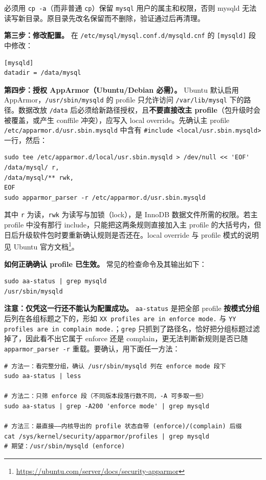 \documentclass[12pt,UTF8]{ctexbook}
\begin{document}
必须用 \texttt{cp -a}（而非普通 \texttt{cp}）保留 \texttt{mysql} 用户的属主和权限，否则 mysqld 无法读写新目录。原目录先改名保留而不删除，验证通过后再清理。

\textbf{第三步：修改配置。} 在 \texttt{/etc/mysql/mysql.conf.d/mysqld.cnf} 的 \texttt{[mysqld]} 段中修改：

\begin{lstlisting}
[mysqld]
datadir = /data/mysql
\end{lstlisting}

\textbf{第四步：授权 AppArmor（Ubuntu/Debian 必需）。} Ubuntu 默认启用 AppArmor，\texttt{/usr/sbin/mysqld} 的 profile 只允许访问 \texttt{/var/lib/mysql} 下的路径。数据改放 \texttt{/data} 后必须给新路径授权，且\textbf{不要直接改主 profile}（包升级时会被覆盖，或产生 conffile 冲突），应写入 local override。先确认主 profile \texttt{/etc/apparmor.d/usr.sbin.mysqld} 中含有 \verb|#include <local/usr.sbin.mysqld>| 一行，然后：

\begin{lstlisting}
sudo tee /etc/apparmor.d/local/usr.sbin.mysqld > /dev/null << 'EOF'
/data/mysql/ r,
/data/mysql/** rwk,
EOF
sudo apparmor_parser -r /etc/apparmor.d/usr.sbin.mysqld
\end{lstlisting}

其中 \texttt{r} 为读，\texttt{rwk} 为读写与加锁（lock），是 InnoDB 数据文件所需的权限。若主 profile 中没有那行 include，只能把这两条规则直接加入主 profile 的大括号内，但日后升级软件包时要重新确认规则是否还在。local override 与 profile 模式的说明见 Ubuntu 官方文档\footnote{\url{https://ubuntu.com/server/docs/security-apparmor}}。

\textbf{如何正确确认 profile 已生效。} 常见的检查命令及其输出如下：

\begin{lstlisting}
sudo aa-status | grep mysqld
/usr/sbin/mysqld
\end{lstlisting}

\textbf{注意：仅凭这一行还不能认为配置成功。} \texttt{aa-status} 是把全部 profile \textbf{按模式分组}后列在各组标题之下的，形如 \texttt{XX profiles are in enforce mode.} 与 \texttt{YY profiles are in complain mode.}；\texttt{grep} 只抓到了路径名，恰好把分组标题过滤掉了，因此看不出它属于 enforce 还是 complain，更无法判断新规则是否已随 \texttt{apparmor\_parser -r} 重载。要确认，用下面任一方法：

\begin{lstlisting}
# 方法一：看完整分组，确认 /usr/sbin/mysqld 列在 enforce mode 段下
sudo aa-status | less

# 方法二：只筛 enforce 段（不同版本段落行数不同，-A 可多取一些）
sudo aa-status | grep -A200 'enforce mode' | grep mysqld

# 方法三：最直接——内核导出的 profile 状态自带 (enforce)/(complain) 后缀
cat /sys/kernel/security/apparmor/profiles | grep mysqld
# 期望：/usr/sbin/mysqld (enforce)
\end{lstlisting}
\end{document}

